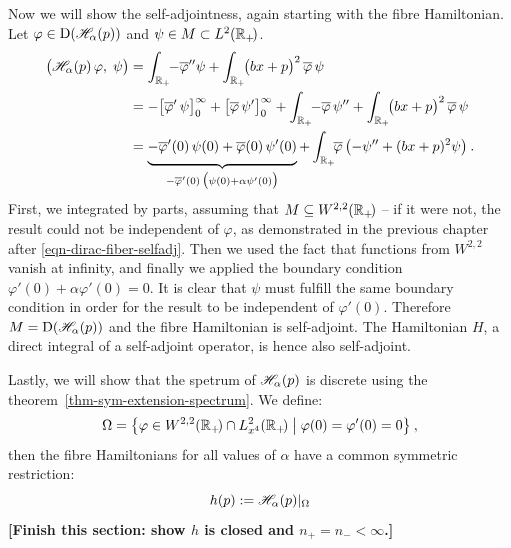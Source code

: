 Now we will show the self-adjointness, again starting with the fibre Hamiltonian. Let $\varphi \in \mathrm{D}(\mathscr{H}_\alpha(p))$ and $\psi \in M \subset L^2(\mathbb{R}_+\!)$.
\begin{align*}
    \big(\Hf_\alpha(p) \, \varphi, \; \psi \big)
    &= \int_{\R_+}\!\! -\overline\varphi'' \psi + \int_{\R_+}\!\! \big(bx + p\big)^2 \, \overline\varphi \, \psi \\
    &= - \big[ \overline\varphi' \, \psi \big]_0^\infty
    + \big[ \overline\varphi \, \psi' \big]_0^\infty
    + \int_{\R_+}\!\! -\overline\varphi \, \psi'' + \int_{\R_+}\!\! \big(bx + p\big)^2 \, \overline\varphi \, \psi \\
    &= \underbrace{
        - \overline\varphi'(0) \, \psi(0)
        + \overline\varphi(0) \, \psi'(0)
        \vphantom{\Big|}
    }_{
        -\overline\varphi'(0) \,
        \big( \psi(0) + \alpha \psi'(0) \big)
    }
    + \int_{\R_+}\!\! \overline\varphi \, \big( {-\psi''} + (bx+p)^2 \psi \big) \: .
\end{align*}
First, we integrated by parts, assuming that $M\subseteq W^{2,2}(\mathbb{R}_+\!)$ ­– if it were not, the result could not be independent of $\varphi$, as demonstrated in the previous chapter after \eqref{eqn-dirac-fiber-selfadj}. Then we used the fact that functions from $W^{2,2}$ vanish at infinity, and finally we applied the boundary condition $\varphi'(0) + \alpha \varphi'(0) = 0$. It is clear that $\psi$ must fulfill the same boundary condition in order for the result to be independent of $\varphi'(0)$. Therefore $M=\mathrm{D}(\mathscr{H}_\alpha(p))$ and the fibre Hamiltonian is self-adjoint. The Hamiltonian $H$, a direct integral of a self-adjoint operator, is hence also self-adjoint.

Lastly, we will show that the spetrum of $\mathscr{H}_\alpha(p)$ is discrete using the theorem~\ref{thm-sym-extension-spectrum}. We define:
\begin{equation*}
    \Omega = \big\{ \varphi \in W^{2,2}(\mathbb{R}_+\!) \cap L^2_{x^4}(\mathbb{R}_+\!) \;\big|\; \varphi(0) = \varphi'(0) = 0 \big\}
    \: ,
\end{equation*}
then the fibre Hamiltonians for all values of $\alpha$ have a common symmetric restriction:
\begin{equation*}
    h(p) := \mathscr{H}_\alpha(p) |_\Omega
\end{equation*}
\textbf{[Finish this section: show $h$ is closed and $n_+=n_-<\infty$.]}

